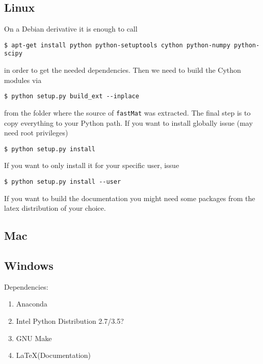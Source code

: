 %
%
%  
%
%
%
%
\subsection{Linux}
On a Debian derivative it is enough to call
\begin{lstlisting}
$ apt-get install python python-setuptools cython python-numpy python-scipy
\end{lstlisting}
in order to get the needed dependencies. Then we need to build the Cython
modules via
\begin{lstlisting}
$ python setup.py build_ext --inplace
\end{lstlisting}
from the folder where the source of \texttt{fastMat} was extracted. The final
step is to copy everything to your Python path. If you want to install
\fm{} globally issue (may need root privileges)
\begin{lstlisting}
$ python setup.py install 
\end{lstlisting}
If you want to only install it for your specific user, issue
\begin{lstlisting}
$ python setup.py install --user
\end{lstlisting}

If you want to build the documentation you might need some packages from the
latex distribution of your choice.

\subsection{Mac}
\subsection{Windows}
Dependencies:
\begin{enumerate}
\item Anaconda
\item Intel Python Distribution 2.7/3.5?
\item GNU Make
\item \LaTeX (Documentation)
\end{enumerate}
